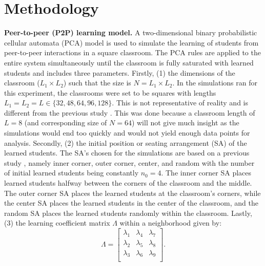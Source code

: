 \documentclass[10pt,a4paper,twoside]{article}
\begin{document}
\section{Methodology}\label{sec:methods}
\textbf{Peer-to-peer (P2P) learning model.} A two-dimensional binary probabilistic cellular automata (PCA) model is used to simulate the learning of students from peer-to-peer interactions in a square classroom. The PCA rules are applied to the entire system simultaneously until the classroom is fully saturated with learned students and includes three parameters. Firstly, (1) the dimensions of the classroom ($L_1 \times L_2$) such that the size is $N=L_1 \times L_2$. In the simulations ran for this experiment, the classrooms were set to be squares with lengths $L_1 = L_2 = L \in \lbrace 32,48,64,96,128\rbrace$. This is not representative of reality and is different from the previous study \cite{roxas2010seating}. This was done because a classroom length of $L=8$ (and corresponding size of $N=64$) will not give much insight as the simulations would end too quickly and would not yield enough data points for analysis. Secondly, (2) the initial position or seating arrangement (SA) of the learned students. The SA's chosen for the simulations are based on a previous study \cite{roxas2010seating}, namely inner corner, outer corner, center, and random with the number of initial learned students being constantly $n_0 = 4$. The inner corner SA places learned students halfway between the corners of the classroom and the middle. The outer corner SA places the learned students at the classroom's corners, while the center SA places the learned students in the center of the classroom, and the random SA places the learned students randomly within the classroom. Lastly, (3) the learning coefficient matrix $\Lambda$ within a neighborhood given by:
\begin{equation}\label{eq:Lambda matrix}
  \Lambda = 
  \begin{bmatrix}
  \lambda_1 & \lambda_4 & \lambda_7\\
  \lambda_2 & \lambda_5 & \lambda_8\\
  \lambda_3 & \lambda_6 & \lambda_9\\
  \end{bmatrix} \text{.}%
\end{equation}
\end{document}
